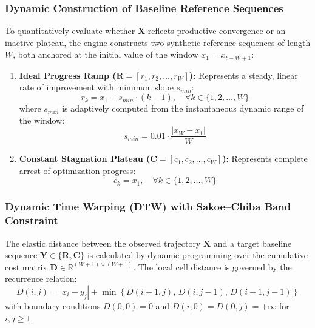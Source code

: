 \documentclass[review]{elsarticle}
\begin{document}
\subsubsection{Dynamic Construction of Baseline Reference Sequences}

To quantitatively evaluate whether $\mathbf{X}$ reflects productive convergence or an inactive plateau, the engine constructs two synthetic reference sequences of length $W$, both anchored at the initial value of the window $x_1 = x_{t-W+1}$:

\begin{enumerate}
    \item \textbf{Ideal Progress Ramp ($\mathbf{R} = [r_1, r_2, \dots, r_W]$):} Represents a steady, linear rate of improvement with minimum slope $s_{min}$:
    \begin{equation}
    r_k = x_1 + s_{min} \cdot (k - 1), \quad \forall k \in \{1, 2, \dots, W\}
    \label{eq:ramp_baseline}
    \end{equation}
    where $s_{min}$ is adaptively computed from the instantaneous dynamic range of the window:
    \begin{equation}
    s_{min} = 0.01 \cdot \frac{|x_W - x_1|}{W}
    \label{eq:adaptive_slope}
    \end{equation}

    \item \textbf{Constant Stagnation Plateau ($\mathbf{C} = [c_1, c_2, \dots, c_W]$):} Represents complete arrest of optimization progress:
    \begin{equation}
    c_k = x_1, \quad \forall k \in \{1, 2, \dots, W\}
    \label{eq:constant_baseline}
    \end{equation}
\end{enumerate}

\subsubsection{Dynamic Time Warping (DTW) with Sakoe--Chiba Band Constraint}

The elastic distance between the observed trajectory $\mathbf{X}$ and a target baseline sequence $\mathbf{Y} \in \{\mathbf{R}, \mathbf{C}\}$ is calculated by dynamic programming over the cumulative cost matrix $\mathbf{D} \in \mathbb{R}^{(W+1) \times (W+1)}$. The local cell distance is governed by the recurrence relation:
\begin{equation}
D(i, j) = |x_i - y_j| + \min \left\{ D(i-1, j),\, D(i, j-1),\, D(i-1, j-1) \right\}
\label{eq:dtw_recurrence}
\end{equation}
with boundary conditions $D(0, 0) = 0$ and $D(i, 0) = D(0, j) = +\infty$ for $i, j \ge 1$.
\end{document}
